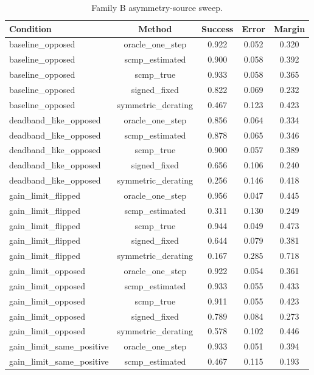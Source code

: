 \begin{table}[t]
\centering
\small
\caption{Family B asymmetry-source sweep.}
\label{tab:asymmetry-sources}
\begin{tabular}{lcccc}
\toprule
Condition & Method & Success & Error & Margin \\
\midrule
baseline\_opposed & oracle\_one\_step & 0.922 & 0.052 & 0.320 \\
baseline\_opposed & scmp\_estimated & 0.900 & 0.058 & 0.392 \\
baseline\_opposed & scmp\_true & 0.933 & 0.058 & 0.365 \\
baseline\_opposed & signed\_fixed & 0.822 & 0.069 & 0.232 \\
baseline\_opposed & symmetric\_derating & 0.467 & 0.123 & 0.423 \\
deadband\_like\_opposed & oracle\_one\_step & 0.856 & 0.064 & 0.334 \\
deadband\_like\_opposed & scmp\_estimated & 0.878 & 0.065 & 0.346 \\
deadband\_like\_opposed & scmp\_true & 0.900 & 0.057 & 0.389 \\
deadband\_like\_opposed & signed\_fixed & 0.656 & 0.106 & 0.240 \\
deadband\_like\_opposed & symmetric\_derating & 0.256 & 0.146 & 0.418 \\
gain\_limit\_flipped & oracle\_one\_step & 0.956 & 0.047 & 0.445 \\
gain\_limit\_flipped & scmp\_estimated & 0.311 & 0.130 & 0.249 \\
gain\_limit\_flipped & scmp\_true & 0.944 & 0.049 & 0.473 \\
gain\_limit\_flipped & signed\_fixed & 0.644 & 0.079 & 0.381 \\
gain\_limit\_flipped & symmetric\_derating & 0.167 & 0.285 & 0.718 \\
gain\_limit\_opposed & oracle\_one\_step & 0.922 & 0.054 & 0.361 \\
gain\_limit\_opposed & scmp\_estimated & 0.933 & 0.055 & 0.433 \\
gain\_limit\_opposed & scmp\_true & 0.911 & 0.055 & 0.423 \\
gain\_limit\_opposed & signed\_fixed & 0.789 & 0.084 & 0.273 \\
gain\_limit\_opposed & symmetric\_derating & 0.578 & 0.102 & 0.446 \\
gain\_limit\_same\_positive & oracle\_one\_step & 0.933 & 0.051 & 0.394 \\
gain\_limit\_same\_positive & scmp\_estimated & 0.467 & 0.115 & 0.193 \\

\end{tabular}
\end{table}

